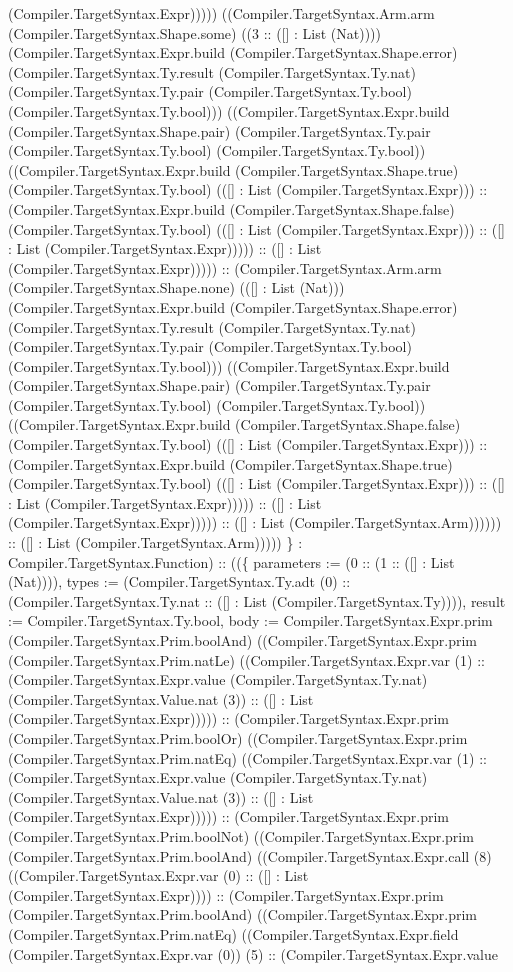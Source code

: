 \documentclass[11pt]{article}
\begin{document}
(Compiler.TargetSyntax.Expr))))) ((Compiler.TargetSyntax.Arm.arm (Compiler.TargetSyntax.Shape.some) ((3 :: ([] : List (Nat)))) (Compiler.TargetSyntax.Expr.build (Compiler.TargetSyntax.Shape.error) (Compiler.TargetSyntax.Ty.result (Compiler.TargetSyntax.Ty.nat) (Compiler.TargetSyntax.Ty.pair (Compiler.TargetSyntax.Ty.bool) (Compiler.TargetSyntax.Ty.bool))) ((Compiler.TargetSyntax.Expr.build (Compiler.TargetSyntax.Shape.pair) (Compiler.TargetSyntax.Ty.pair (Compiler.TargetSyntax.Ty.bool) (Compiler.TargetSyntax.Ty.bool)) ((Compiler.TargetSyntax.Expr.build (Compiler.TargetSyntax.Shape.true) (Compiler.TargetSyntax.Ty.bool) (([] : List (Compiler.TargetSyntax.Expr))) :: (Compiler.TargetSyntax.Expr.build (Compiler.TargetSyntax.Shape.false) (Compiler.TargetSyntax.Ty.bool) (([] : List (Compiler.TargetSyntax.Expr))) :: ([] : List (Compiler.TargetSyntax.Expr))))) :: ([] : List (Compiler.TargetSyntax.Expr))))) :: (Compiler.TargetSyntax.Arm.arm (Compiler.TargetSyntax.Shape.none) (([] : List (Nat))) (Compiler.TargetSyntax.Expr.build (Compiler.TargetSyntax.Shape.error) (Compiler.TargetSyntax.Ty.result (Compiler.TargetSyntax.Ty.nat) (Compiler.TargetSyntax.Ty.pair (Compiler.TargetSyntax.Ty.bool) (Compiler.TargetSyntax.Ty.bool))) ((Compiler.TargetSyntax.Expr.build (Compiler.TargetSyntax.Shape.pair) (Compiler.TargetSyntax.Ty.pair (Compiler.TargetSyntax.Ty.bool) (Compiler.TargetSyntax.Ty.bool)) ((Compiler.TargetSyntax.Expr.build (Compiler.TargetSyntax.Shape.false) (Compiler.TargetSyntax.Ty.bool) (([] : List (Compiler.TargetSyntax.Expr))) :: (Compiler.TargetSyntax.Expr.build (Compiler.TargetSyntax.Shape.true) (Compiler.TargetSyntax.Ty.bool) (([] : List (Compiler.TargetSyntax.Expr))) :: ([] : List (Compiler.TargetSyntax.Expr))))) :: ([] : List (Compiler.TargetSyntax.Expr))))) :: ([] : List (Compiler.TargetSyntax.Arm)))))) :: ([] : List (Compiler.TargetSyntax.Arm))))) \} : Compiler.TargetSyntax.Function) :: ((\{ parameters := (0 :: (1 :: ([] : List (Nat)))), types := (Compiler.TargetSyntax.Ty.adt (0) :: (Compiler.TargetSyntax.Ty.nat :: ([] : List (Compiler.TargetSyntax.Ty)))), result := Compiler.TargetSyntax.Ty.bool, body := Compiler.TargetSyntax.Expr.prim (Compiler.TargetSyntax.Prim.boolAnd) ((Compiler.TargetSyntax.Expr.prim (Compiler.TargetSyntax.Prim.natLe) ((Compiler.TargetSyntax.Expr.var (1) :: (Compiler.TargetSyntax.Expr.value (Compiler.TargetSyntax.Ty.nat) (Compiler.TargetSyntax.Value.nat (3)) :: ([] : List (Compiler.TargetSyntax.Expr))))) :: (Compiler.TargetSyntax.Expr.prim (Compiler.TargetSyntax.Prim.boolOr) ((Compiler.TargetSyntax.Expr.prim (Compiler.TargetSyntax.Prim.natEq) ((Compiler.TargetSyntax.Expr.var (1) :: (Compiler.TargetSyntax.Expr.value (Compiler.TargetSyntax.Ty.nat) (Compiler.TargetSyntax.Value.nat (3)) :: ([] : List (Compiler.TargetSyntax.Expr))))) :: (Compiler.TargetSyntax.Expr.prim (Compiler.TargetSyntax.Prim.boolNot) ((Compiler.TargetSyntax.Expr.prim (Compiler.TargetSyntax.Prim.boolAnd) ((Compiler.TargetSyntax.Expr.call (8) ((Compiler.TargetSyntax.Expr.var (0) :: ([] : List (Compiler.TargetSyntax.Expr)))) :: (Compiler.TargetSyntax.Expr.prim (Compiler.TargetSyntax.Prim.boolAnd) ((Compiler.TargetSyntax.Expr.prim (Compiler.TargetSyntax.Prim.natEq) ((Compiler.TargetSyntax.Expr.field (Compiler.TargetSyntax.Expr.var (0)) (5) :: (Compiler.TargetSyntax.Expr.value 
\end{document}
